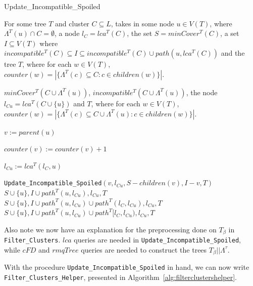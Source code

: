 \documentclass{article}
\newcommand{\leafset}{\Lambda}
\newcommand{\TB}{T_\beta}
\begin{document}
    \begin{algorithm}
        \caption{Update\_Incompatible\_Spoiled}
        \label{alg:updateincompatiblespoiled}

        \begin{algorithmic}[1]
            \Input For some tree $T$ and cluster $C \subseteq L$, takes in some node $u \in V(T)$, where $\leafset^{T}(u) \cap C = \emptyset$, a node $l_C = lca^{T}(C)$, the set $S = minCover^{T}(C)$, a set $I \subseteq V(T)$ where $incompatible^{T}(C) \subseteq I \subseteq incompatible^{T}(C) \cup path(u, lca^T(C))$ and the tree $T$, where for each $w \in V(T)$, $counter(w) = |\{\leafset^{T}(c) \subseteq C : c \in children(w)\}|$.

            \Output $minCover^{T}(C \cup \leafset^{T}(u))$, $incompatible^{T}(C \cup \leafset^{T}(u))$, the node $l_{Cu} = lca^{T}(C \cup \{u\})$ and $T$, where for each $w \in V(T)$, $counter(w) = |\{\leafset^{T}(c) \subseteq C \cup \leafset^{T}(u) : c \in children(w)\}|$.

            \State $v := parent(u)$

            \State $counter(v) := counter(v) + 1$

            \State $l_{Cu} := lca^T(l_C, u)$

                \State \Return \texttt{Update\_Incompatible\_Spoiled}$(v, l_{Cu}, S - children(v), I - v, T)$
                \State \Return $S \cup \{u\}, I \cup path^{T}(u, l_{Cu}), l_{Cu}, T$
                \State \Return $S \cup \{u\}, I \cup path^{T}(u, l_{Cu}) \cup path^{T}(l_C, l_{Cu}), l_{Cu}, T$
            \Else
                \State \Return $S \cup \{u\}, I \cup path^{T}(u, l_{Cu}) \cup path^{T}[l_C, l_{Cu}), l_{Cu}, T$
            \EndIf
        \end{algorithmic}
    \end{algorithm}

    Also note we now have an explanation for the preprocessing done on $\TB$ in \texttt{Filter\_Clusters}. $lca$ queries are needed in \texttt{Update\_Incompatible\_Spoiled}, while $cFD$ and $rmqTree$ queries are needed to construct the trees $\TB||\leafset^{\tau}$.

    With the procedure \texttt{Update\_Incompatible\_Spoiled} in hand, we can now write \texttt{Filter\_Clusters\_Helper}, presented in Algorithm~\ref{alg:filterclustershelper}.
\end{document}
